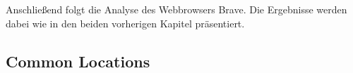 Anschließend folgt die Analyse des Webbrowsers Brave. Die Ergebnisse werden dabei wie in den beiden vorherigen Kapitel präsentiert.

\subsection*{Common Locations}

